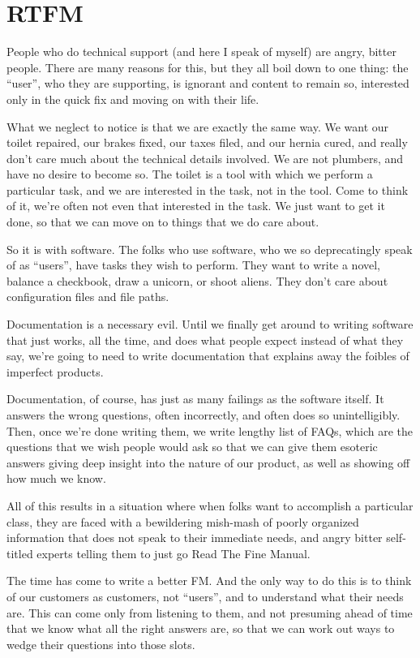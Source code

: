 \chapter{RTFM}

People who do technical support (and here I speak of myself)
are angry, bitter people. There are many
reasons for this, but they all boil down to one thing: the ``user'', who
they are supporting, is ignorant and content to remain so, interested
only in the quick fix and moving on with their life.

What we neglect to notice is that we are exactly the same way. We want
our toilet repaired, our brakes fixed, our taxes filed, and our hernia
cured, and really don't care much about the technical details involved.
We are not plumbers, and have no desire to become so. The toilet is a tool
with which we perform a particular task, and we are interested in the
task, not in the tool. Come to think of it, we're often not even that
interested in the task. We just want to get it done, so that we can move
on to things that we do care about.

So it is with software. The folks who use software, who we so
deprecatingly speak of as ``users'', have tasks they wish to perform.
They want to write a novel, balance a checkbook, draw a unicorn, or
shoot aliens. They don't care about configuration files and file paths.

Documentation is a necessary evil. Until we finally get around to
writing software that just works, all the time, and does what people
expect instead of what they say, we're going to need to write
documentation that explains away the foibles of imperfect products.

Documentation, of course, has just as many failings as the software
itself. It answers the wrong questions, often incorrectly, and often
does so unintelligibly. Then, once we're done writing them, we write
lengthy list of FAQs, which are the questions that we wish people would
ask so that we can give them esoteric answers giving deep insight into
the nature of our product, as well as showing off how much we know.

All of this results in a situation where when folks want to accomplish a
particular class, they are faced with a bewildering mish-mash of poorly
organized information that does not speak to their immediate needs, and
angry bitter self-titled experts telling them to just go Read The Fine
Manual.

The time has come to write a better FM. And the only way to do this is
to think of our customers as customers, not ``users'', and to understand
what their needs are. This can come only from listening to them, and not
presuming ahead of time that we know what all the right answers are, so
that we can work out ways to wedge their questions into those slots.

